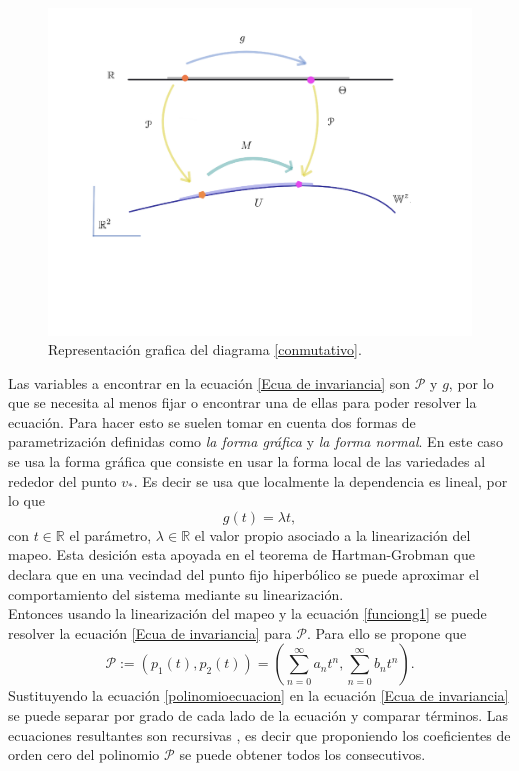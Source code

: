 \begin{figure}[h!]
	\centering
	\includegraphics[scale=0.4]{diagrama2}
	\caption{Representación grafica del diagrama \eqref{conmutativo}.}
	\label{diagrama-conmutativo}
\end{figure}

Las variables a encontrar en la ecuaci\'on \ref{Ecua de invariancia} son $\mathcal{P}$ y $g$, por lo que se necesita al menos fijar o encontrar una de ellas para poder resolver la ecuaci\'on. Para hacer esto se suelen tomar en cuenta dos formas de parametrizaci\'on definidas como \textit{la forma gr\'afica} y \textit{la forma normal}. En este caso se usa la forma gr\'afica que consiste en usar la forma local de las variedades al rededor del punto $v_{*}$. Es decir se usa que localmente la dependencia es lineal, por lo que 
\begin{equation}
g(t) = \lambda t,
\label{funciong1}
\end{equation}
con $t\in \mathbb{R}$ el par\'ametro, $\lambda\in \mathbb{R}$ el valor propio asociado a la linearizaci\'on del mapeo. Esta desici\'on esta apoyada en el teorema de Hartman-Grobman que declara que en una vecindad del punto fijo hiperb\'olico se puede aproximar el comportamiento del sistema mediante su linearizaci\'on. \\

Entonces usando la linearizaci\'on del mapeo y la ecuaci\'on \eqref{funciong1} se puede resolver la ecuaci\'on \eqref{Ecua de invariancia} para $\mathcal{P}$. Para ello se propone que 
\begin{equation}
\mathcal{P} := (p_{1}(t), p_{2}(t)) =( \sum_{n=0}^{\infty}a_{n}t^{n}, \sum_{n=0}^{\infty}b_{n}t^{n}).
\label{polinomioecuacion}
\end{equation}
Sustituyendo la ecuaci\'on \eqref{polinomioecuacion} en la ecuaci\'on \eqref{Ecua de invariancia} se puede separar por grado de cada lado de la ecuaci\'on y comparar t\'erminos.  Las ecuaciones resultantes son recursivas , es decir que proponiendo los coeficientes de orden cero del polinomio $\mathcal{P}$ se puede obtener todos los consecutivos. 


